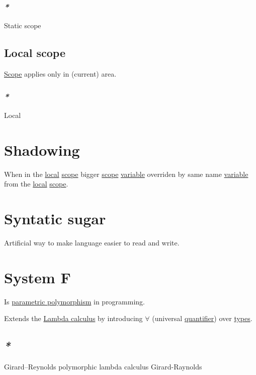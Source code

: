 \documentclass[a4paper,14pt,oneside]{book}
\begin{document}
\subsubsection{\emph{*}}
\label{sec:org9eb4038}

\label{org3f87275}Static scope

\subsection{\label{org16881f8}Local scope}
\label{sec:org7cbfa2a}
\hyperref[orgeca725f]{Scope} applies only in (current) area.

\subsubsection{\emph{*}}
\label{sec:orgfe2f206}

\label{org223c105}Local

\section{\label{org6d9df6d}Shadowing}
\label{sec:orgc10af8d}
When in the \hyperref[org223c105]{local} \hyperref[orgeca725f]{scope} bigger \hyperref[orgeca725f]{scope} \hyperref[org00eb23e]{variable} overriden by same name \hyperref[org00eb23e]{variable} from the \hyperref[org223c105]{local} \hyperref[orgeca725f]{scope}.

\section{\label{org04e27d2}Syntatic sugar}
\label{sec:org15de559}
Artificial way to make language easier to read and write.

\section{\label{org33b99c0}System F}
\label{sec:org7866581}
Is \hyperref[org95aa119]{parametric polymorphism} in programming.

Extends the \hyperref[orgad1cdf1]{Lambda calculus} by introducing \(\forall\) (universal \hyperref[orgd404adf]{quantifier}) over \hyperref[org90f7adb]{types}.

\subsection{\emph{*}}
\label{sec:org139f6ea}

\label{orgf6e3a68}Girard–Reynolds polymorphic lambda calculus
\label{orgb391241}Girard-Raynolds
\end{document}
